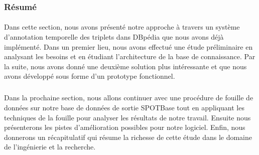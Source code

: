 \documentclass[12pt,a4	]{report}
\begin{document}
\subsubsection*{Résumé}
\paragraph{}
Dans cette section, nous avons présenté notre approche à travers un système d'annotation temporelle des triplets dans DBpédia que nous avons déjà implémenté. Dans un premier lieu, nous avons effectué une étude préliminaire en analysant les besoins et en étudiant l'architecture de la base de connaissance.
Par la suite, nous avons donné une deuxième solution plus intéressante et que nous avons développé  sous forme d'un prototype fonctionnel.
\subparagraph{}
Dans la prochaine section, nous allons continuer avec une procédure de fouille de données sur notre base de données de sortie SPOTBase tout en appliquant les techniques de la fouille pour analyser les résultats de notre travail. Ensuite nous présenterons les pistes d'amélioration possibles pour notre logiciel. Enfin, nous donnerons un récapitulatif qui résume la richesse de cette étude dans le domaine de l'ingénierie et la recherche.

\end{document}

